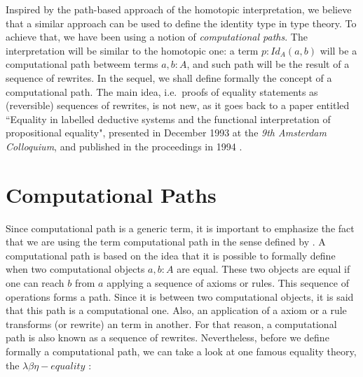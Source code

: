 \documentclass{entcs} \usepackage{entcsmacro}
\begin{document}
Inspired by the path-based approach of the homotopic interpretation, we believe that a similar approach can be used to define the identity type in type theory. To achieve that, we have been using a notion of {\em computational paths}. The interpretation will be similar to the homotopic one: a term $p : Id_{A}(a,b)$ will be a computational path betweem terms $a, b : A$, and such path will be the result of a sequence of rewrites. In the sequel, we shall define formally the concept of a computational path. The main idea, i.e.\ proofs of equality statements as (reversible) sequences of rewrites, is not new, as it goes back to a paper entitled ``Equality in labelled deductive systems and the functional interpretation of propositional equality", presented in December 1993 at the {\em 9th Amsterdam Colloquium\/}, and published in the proceedings in 1994 \cite{Ruy4}.

\section{Computational Paths} \label{path}

Since computational path is a generic term, it is important to emphasize the fact that we are using the term computational path in the sense defined by \cite{Ruy5}. A computational path is based on the idea that it is possible to formally define when two computational objects $a,b : A$ are equal. These two objects are equal if one can reach $b$ from $a$ applying a sequence of axioms or rules. This sequence of operations forms a path. Since it is between two computational objects, it is said that this path is a computational one. Also, an application of a axiom or a rule transforms (or rewrite) an term in another. For that reason, a computational path is also known as a sequence of rewrites. Nevertheless, before we define formally a computational path, we can take a look at one famous equality theory, the $\lambda\beta\eta-equality$ \cite{lambda}:
\end{document}
